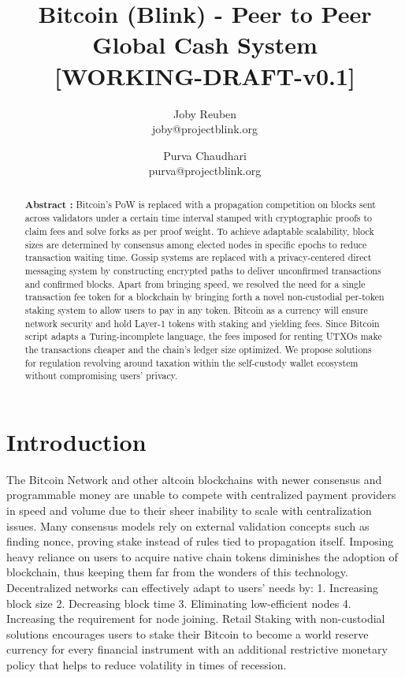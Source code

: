\documentclass[a4paper,10pt]{article}
\title{
 \large \textbf{Bitcoin (Blink) - Peer to Peer Global Cash System}\\
\vspace{6mm}
\scriptsize[WORKING-DRAFT-v0.1]
}
\author{ \myfontt Joby Reuben \\ \myfontt joby@projectblink.org \and  \myfontt Purva Chaudhari \\ \myfontt purva@projectblink.org}
\date{}
\begin{document}
\maketitle
\begin{abstract}
\noindent \textbf{Abstract :} Bitcoin's PoW is replaced with a propagation competition on blocks sent across validators under a certain time interval stamped with cryptographic proofs to claim fees and solve forks as per proof weight. To achieve adaptable scalability, block sizes are determined by consensus among elected nodes in specific epochs to reduce transaction waiting time. Gossip systems are replaced with a privacy-centered direct messaging system by constructing encrypted paths to deliver unconfirmed transactions and confirmed blocks. Apart from bringing speed, we resolved the need for a single transaction fee token for a blockchain by bringing forth a novel non-custodial per-token staking system to allow users to pay in any token. Bitcoin as a currency will ensure network security and hold Layer-1 tokens with staking and yielding fees. Since Bitcoin script adapts a Turing-incomplete language, the fees imposed for renting UTXOs make the transactions cheaper and the chain's ledger size optimized. We propose solutions for regulation revolving around taxation within the self-custody wallet ecosystem without compromising users' privacy. 
\end{abstract}
\section{Introduction}
The Bitcoin Network and other altcoin blockchains with newer consensus and programmable money are unable to compete with centralized payment providers in speed and volume due to their sheer inability to scale with centralization issues. Many consensus models rely on external validation concepts such as finding nonce, proving stake instead of rules tied to propagation itself. Imposing heavy reliance on users to acquire native chain tokens diminishes the adoption of blockchain, thus keeping them far from the wonders of this technology. Decentralized networks can effectively adapt to users’ needs by: 1. Increasing block size 2. Decreasing block time 3. Eliminating low-efficient nodes 4. Increasing the requirement for node joining. Retail Staking with non-custodial solutions encourages users to stake their Bitcoin to become a world reserve currency for every financial instrument with an additional restrictive monetary policy that helps to reduce volatility in times of recession.
\end{document}
